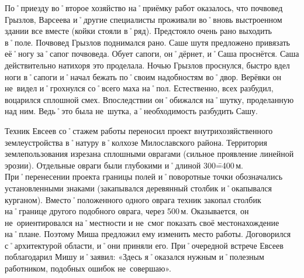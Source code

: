 По˚приезду во˚второе хозяйство на˚приёмку работ оказалось, что почвовед Грызлов, Варсеева и˚другие специалисты проживали во˚вновь выстроенном здании все вместе (койки стояли в˚ряд). Предстояло очень рано выходить в˚поле. Почвовед Грызлов поднимался рано. Саше шутя предложено привязать её˚ногу за˚сапог почвоведа. Обует сапоги, он˚дёрнет, и˚Саша проснётся. Саша действительно натихоря это проделала. Ночью Грызлов проснулся, быстро вдел ноги в˚сапоги и˚начал бежать по˚своим надобностям во˚двор. Верёвки он не~видел и˚грохнулся со˚всего маха на˚пол. Естественно, всех разбудил, воцарился сплошной смех. Впоследствии он˚обижался на˚шутку, проделанную над ним. Ведь˚это была не~шутка, а˚необходимость разбудить Сашу.

Техник Евсеев со˚стажем работы переносил проект внутрихозяйственного землеустройства в˚натуру в˚колхозе Милославского района. Территория землепользования изрезана сплошными оврагами (сильное проявление линейной эрозии). Отдельные овраги были глубокими и˚длиной 300\==400\,м. При˚перенесении проекта границы полей и˚поворотные точки обозначались установленными знаками (закапывался деревянный столбик и˚окапывался курганом). Вместо˚положенного одного оврага техник закопал столбик на˚границе другого подобного оврага, через 500\,м. Оказывается, он не~ориентировался на˚местности и не~смог показать своё местонахождение на˚плане. Поэтому Миша предложил ему изменить место работы. Договорился с˚архитектурой области, и˚они приняли его. При˚очередной встрече Евсеев поблагодарил Мишу и˚заявил: «Здесь я˚оказался нужным и˚полезным работником, подобных ошибок не~совершаю».

